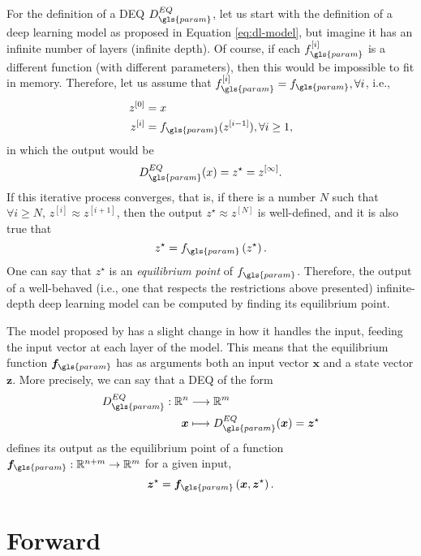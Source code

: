 For the definition of a \gls{DEQ} $D^{EQ}_{\gls{param}}$, let us start with the definition of a deep learning model as proposed in Equation \eqref{eq:dl-model}, but imagine it has an infinite number of layers (infinite depth).
Of course, if each $f^{[i]}_{\gls{param}}$ is a different function (with different parameters), then this would be impossible to fit in memory.
Therefore, let us assume that $f_{\gls{param}}^{[i]}=f_{\gls{param}},\forall i$, i.e.,
\begin{equation*}
\begin{split}
    z^{[0]} &= x \\
    z^{[i]} &= f_{\gls{param}}(z^{[i-1]}), \forall i\ge 1
,\end{split}
\end{equation*}
in which the output would be \[
D_{\gls{param}}^{EQ}(x) = z^{\star} = z^{[\infty]}
.\]
If this iterative process converges, that is, if there is a number $N$ such that $\forall i\ge N,\,z^{[i]}\approx z^{[i+1]}$, then the output $z^{\star}\approx z^{[N]}$ is well-defined, and it is also true that  \[
    z^{\star} = f_{\gls{param}}\left( z^{\star} \right) 
.\] 
One can say that $z^{\star}$ is an \emph{equilibrium point} of $f_{\gls{param}}$.
Therefore, the output of a well-behaved (i.e., one that respects the restrictions above presented) infinite-depth deep learning model can be computed by finding its equilibrium point.

The model proposed by \textcite{Bai2019} has a slight change in how it handles the input, feeding the input vector at each layer of the model.
This means that the equilibrium function $\bm{f}_{\gls{param}}$ has as arguments both an input vector $\bm{x}$ and a state vector $\bm{z}$.
More precisely, we can say that a \gls{DEQ} of the form
\begin{align*}
    D^{EQ}_{\gls{param}}: \R^{n} &\longrightarrow \R^{m} \\
    \bm{x} &\longmapsto D^{EQ}_{\gls{param}}(\bm{x}) = \bm{z}^{\star}
\end{align*}
defines its output as the equilibrium point of a function $\bm{f}_{\gls{param}}:\R^{n+m}\to \R^{m}$ for a given input, 
\begin{equation}\label{eq:z-star}
    \bm{z}^{\star} = \bm{f}_{\gls{param}}\left( \bm{x},\bm{z}^{\star} \right) 
.\end{equation}

\section{Forward}\label{sec:deq-forward}

